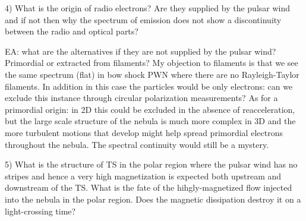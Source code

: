 4) What is the origin of radio electrons? Are they supplied by the pulsar wind and if not then why the spectrum of emission does not show a discontinuity between the radio and optical parts? 

EA: what are the alternatives if they are not supplied by the pulsar wind? Primordial or extracted from filaments? My objection to filaments is that we see the same spectrum (flat) in bow shock PWN where there are no Rayleigh-Taylor filaments. In addition in this case the particles would be only electrons: can we exclude this instance through circular polarization measurements? As for a primordial origin: in 2D this could be excluded in the absence of reacceleration, but the large scale structure of the nebula is much more complex in 3D and the more turbulent motions that develop might help spread primordial electrons throughout the nebula. The spectral continuity would still be a mystery.


5) What is the structure of TS in the polar region where the pulsar wind has no stripes and hence a very high magnetization is expected both upstream and downstream of the TS. What is the fate of the hihgly-magnetized flow injected into the nebula in the polar region. Does the magnetic dissipation destroy it on a light-crossing time? 


